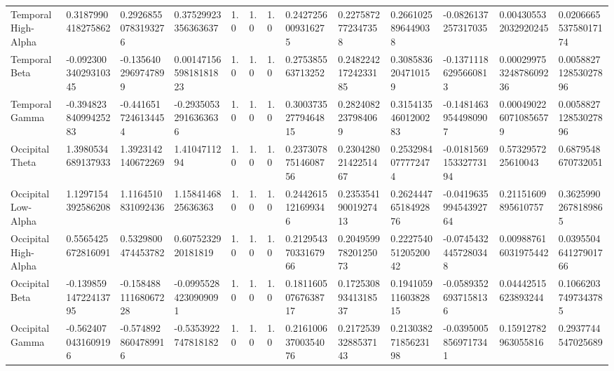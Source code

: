 \begin{longtable}{lllllllllllll}
Temporal High-Alpha  &    0.3187990418275862 &   0.29268550783193276 &    0.37529923356363637 &      1.0 &              1.0 &                1.0 &   0.2427256009316275 &   0.2275872772347358 &   0.2661025896449038 &     -0.0826137257317035 &    0.004305532032920245 &  0.020666553758017174 \\
Temporal Beta        &  -0.09230034029310345 &   -0.1356402969747899 &  0.0014715659818181823 &      1.0 &              1.0 &                1.0 &    0.275385563713252 &  0.24822421724233185 &   0.3085836204710159 &    -0.13711186295660813 &  0.00029975324878609236 &  0.005882712853027896 \\
Temporal Gamma       &  -0.39482384099425283 &   -0.4416517246134454 &   -0.29350532916363636 &      1.0 &              1.0 &                1.0 &  0.30037352779464815 &   0.2824082237984069 &  0.31541354601200283 &    -0.14814639544980907 &   0.0004902260710856579 &  0.005882712853027896 \\
Occipital Theta      &    1.3980534689137933 &    1.3923142140672269 &           1.4104711294 &      1.0 &              1.0 &                1.0 &  0.23730787514608756 &  0.23042802142251467 &   0.2532984077772474 &   -0.018156915332773194 &      0.5732957225610043 &    0.6879548670732051 \\
Occipital Low-Alpha  &    1.1297154392586208 &    1.1164510831092436 &     1.1584146825636363 &      1.0 &              1.0 &                1.0 &   0.2442615121699346 &  0.23535419001927413 &  0.26244476518492876 &   -0.041963599454392764 &     0.21151609895610757 &   0.36259902678189865 \\
Occipital High-Alpha &    0.5565425672816091 &    0.5329800474453782 &     0.6075232920181819 &      1.0 &              1.0 &                1.0 &  0.21295437033167966 &  0.20495997820125073 &  0.22275405120520042 &    -0.07454324457280348 &    0.009887616031975442 &  0.039550464127901766 \\
Occipital Beta       &  -0.13985914722413795 &  -0.15848811168067228 &   -0.09955284230909091 &      1.0 &              1.0 &                1.0 &  0.18116050767638717 &  0.17253089341318537 &  0.19410591160382815 &    -0.05893526937158136 &     0.04442515623893244 &   0.10662037497343785 \\
Occipital Gamma      &   -0.5624070431609196 &   -0.5748928604789916 &    -0.5353922747818182 &      1.0 &              1.0 &                1.0 &  0.21610063700354076 &  0.21725393288537143 &  0.21303827185623198 &    -0.03950058569717341 &     0.15912782963055816 &    0.2937744547025689 \\
\end{longtable}
